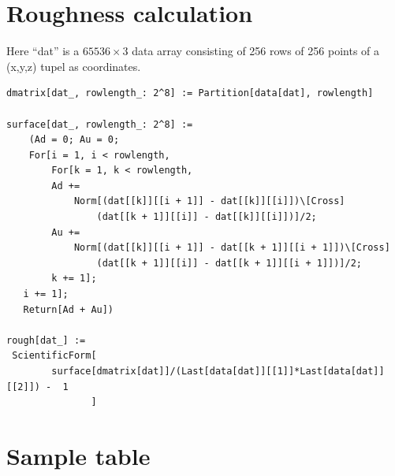 \section{Roughness calculation}
\label{roughness}
Here ``dat'' is a $65536 \times 3$ data array consisting of 256 rows of 256 
points of a (x,y,z) tupel as coordinates.

\scriptsize
\lstset{language=Mathematica}

\begin{lstlisting}
dmatrix[dat_, rowlength_: 2^8] := Partition[data[dat], rowlength]

surface[dat_, rowlength_: 2^8] := 
    (Ad = 0; Au = 0;
    For[i = 1, i < rowlength,
   	    For[k = 1, k < rowlength,
        Ad += 
            Norm[(dat[[k]][[i + 1]] - dat[[k]][[i]])\[Cross]
                (dat[[k + 1]][[i]] - dat[[k]][[i]])]/2;
        Au += 
            Norm[(dat[[k]][[i + 1]] - dat[[k + 1]][[i + 1]])\[Cross]
                (dat[[k + 1]][[i]] - dat[[k + 1]][[i + 1]])]/2; 
        k += 1];
   i += 1]; 
   Return[Ad + Au])

rough[dat_] := 
 ScientificForm[
        surface[dmatrix[dat]]/(Last[data[dat]][[1]]*Last[data[dat]][[2]]) -  1
               ]

\end{lstlisting}
\section{Sample table}

